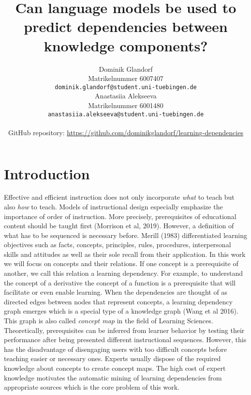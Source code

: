 \documentclass{article}
\title{Can language models be used to predict dependencies between knowledge components?}
\author{%
  Dominik Glandorf\\
  Matrikelnummer 6007407\\
  \texttt{dominik.glandorf@student.uni-tuebingen.de} \\
  \And
  Anastasiia Alekseeva\\
  Matrikelnummer 6001480\\
  \texttt{anastasiia.alekseeva@student.uni-tuebingen.de} \\
  \\
  GitHub repository: \url{https://github.com/dominikglandorf/learning-dependencies}
}
\begin{document}
\vspace*{-5mm}
\maketitle
\vspace*{-5mm}

\begin{abstract}





\end{abstract}

\section{Introduction}
Effective and efficient instruction does not only incorporate \textit{what} to teach but also \textit{how} to teach. Models of instructional design especially emphasize the importance of order of instruction. More precisely, prerequisites of educational content should be taught first (Morrison et al, 2019).
However, a definition of what has to be sequenced is necessary before. Merill (1983) differentiated learning objectives such as facts, concepts, principles, rules, procedures, interpersonal skills and attitudes as well as their sole recall from their application. In this work we will focus on concepts and their relations.
If one concept is a prerequisite of another, we call this relation a learning dependency. For example, to understand the concept of a derivative the concept of a function is a prerequisite that will facilitate or even enable learning. When the dependencies are thought of as directed edges between nodes that represent concepts, a learning dependency graph emerges which is a special type of a knowledge graph (Wang et al 2016). This graph is also called \textit{concept map} in the field of Learning Sciences.
Theoretically, prerequisites can be inferred from learner behavior by testing their performance after being presented different instructional sequences. However, this has the disadvantage of disengaging users with too difficult concepts before teaching easier or necessary ones. Experts usually dispose of the required knowledge about concepts to create concept maps. The high cost of expert knowledge motivates the automatic mining of learning dependencies from appropriate sources which is the core problem of this work.
\end{document}
